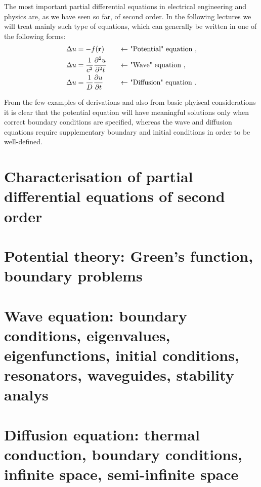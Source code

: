 \documentclass[11pt,a4paper]{report}
\def\bm{\ensuremath\mathbf}
\def\lap{\ensuremath\Delta}
\begin{document}
The most important partial differential equations in electrical engineering and physics are, as we have seen so far, of second order. In the following lectures we will treat mainly such type of equations, which can 
generally be written in one of the following forms:
\begin{alignat*}{2}
  \lap u &= -f(\bm{r}) &\quad \leftarrow &\text{ "Potential" equation }, \\
  \lap u &= \frac{1}{c^2}\frac{\partial^2 u}{\partial^2 t} &\quad \leftarrow &\text{ "Wave" equation },\\
  \lap u &= \frac{1}{D}\frac{\partial u}{\partial t} &\quad \leftarrow &\text{ "Diffusion" equation }.\\
\end{alignat*}

From the few examples of derivations and also from basic phyiscal considerations it is clear that the potential equation will have meaningful solutions only when correct boundary conditions are specified, whereas the wave and diffusion equations require supplementary boundary and initial conditions in order to be well-defined. 

 
\chapter{Characterisation of partial differential equations of second order}

\chapter{Potential theory: Green's function, boundary problems}
\chapter{Wave equation: boundary conditions, eigenvalues, eigenfunctions, initial conditions, resonators, waveguides, stability analys}
\chapter{Diffusion equation: thermal conduction, boundary conditions, infinite space, semi-infinite space} 
\end{document}
